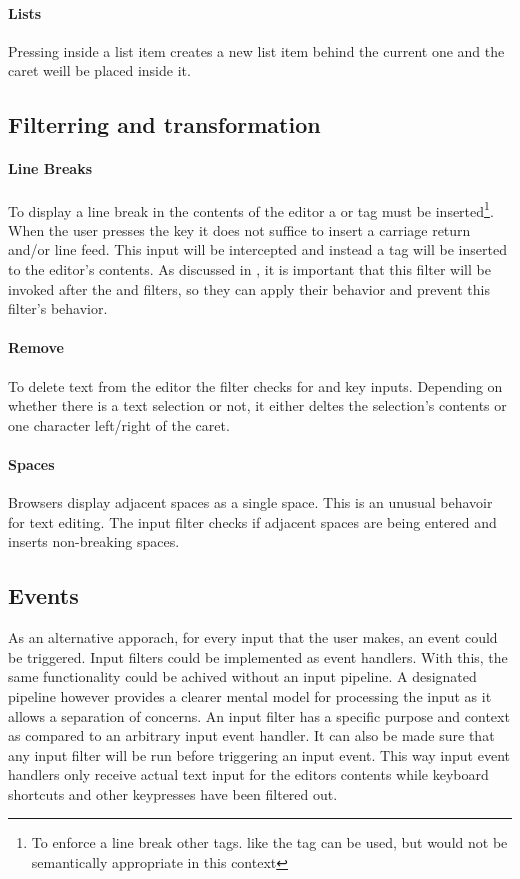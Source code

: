 \paragraph{Lists} Pressing  inside a list item creates a new list item behind the current one and the caret weill be placed inside it.

\subsection{Filterring and transformation}

\paragraph{Line Breaks} To display a line break in the contents of the editor a  or  tag must be inserted\footnote{To enforce a line break other tags. like the  tag can be used, but would not be semantically appropriate in this context}. When the user presses the  key it does not suffice to insert a carriage return and/or line feed. This input will be intercepted and instead a  tag will be inserted to the editor's contents. As discussed in , it is important that this filter will be invoked after the  and  filters, so they can apply their behavior and prevent this filter's behavior.

\paragraph{Remove} To delete text from the editor the  filter checks for  and  key inputs. Depending on whether there is a text selection or not, it either deltes the selection's contents or one character left/right of the caret.

\paragraph{Spaces} Browsers display adjacent spaces as a single space. This is an unusual behavoir for text editing. The  input filter checks if adjacent spaces are being entered and inserts non-breaking spaces.

\subsection{Events} As an alternative apporach, for every input that the user makes, an event could be triggered. Input filters could be implemented as event handlers. With this, the same functionality could be achived without an input pipeline. A designated pipeline however provides a clearer mental model for processing the input as it allows a separation of concerns. An input filter has a specific purpose and context as compared to an arbitrary input event handler. It can also be made sure that any input filter will be run before triggering an input event. This way input event handlers only receive actual text input for the editors contents while keyboard shortcuts and other keypresses have been filtered out.

